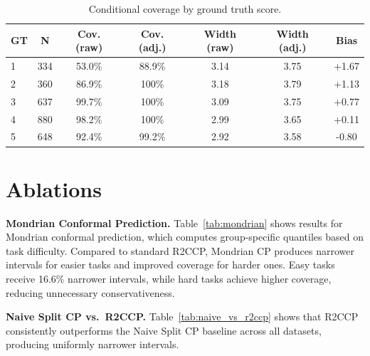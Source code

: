 \documentclass{article}
\begin{document}
\begin{table}[t]
\centering
\caption{Conditional coverage by ground truth score.}
\label{tab:conditional}
\small
\begin{tabular}{lcccccc}
\toprule
\textbf{GT} & \textbf{N} & \textbf{Cov. (raw)} & \textbf{Cov. (adj.)} & \textbf{Width (raw)} & \textbf{Width (adj.)} & \textbf{Bias} \\
\midrule
1 & 334 & 53.0\% & 88.9\% & 3.14 & 3.75 & +1.67 \\
2 & 360 & 86.9\% & 100\% & 3.18 & 3.79 & +1.13 \\
3 & 637 & 99.7\% & 100\% & 3.09 & 3.75 & +0.77 \\
4 & 880 & 98.2\% & 100\% & 2.99 & 3.65 & +0.11 \\
5 & 648 & 92.4\% & 99.2\% & 2.92 & 3.58 & -0.80 \\
\bottomrule
\end{tabular}
\end{table}

\section{Ablations}

\textbf{Mondrian Conformal Prediction.}
Table~\ref{tab:mondrian} shows results for Mondrian conformal prediction, which computes group-specific quantiles based on task difficulty. Compared to standard R2CCP, Mondrian CP produces narrower intervals for easier tasks and improved coverage for harder ones. Easy tasks receive 16.6\% narrower intervals, while hard tasks achieve higher coverage, reducing unnecessary conservativeness.

\textbf{Naive Split CP vs.\ R2CCP.}
Table~\ref{tab:naive_vs_r2ccp} shows that R2CCP consistently outperforms the Naive Split CP baseline across all datasets, producing uniformly narrower intervals.
\end{document}
